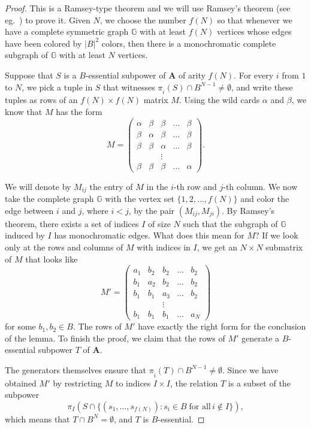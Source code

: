 \documentclass{amsart}
\theoremstyle{plain}
\theoremstyle{definition}
\begin{document}
\begin{proof}
  This is a Ramsey-type theorem and we will use Ramsey's theorem (see eg.~\cite[Theorem 3.3]{a-course-in-combinatorics}) to prove it.
  Given $N$, we choose the number $f(N)$ so that whenever we have a complete symmetric
  graph ${\mathbb{{G}}}$ with at least $f(N)$ vertices whose
  edges have been colored by $|B|^2$ colors, then there is a monochromatic
  complete subgraph of ${\mathbb{{G}}}$ with at least $N$ vertices. 
  
  Suppose that $S$ is a $B$-essential subpower of ${{\mathbf{A}}}$ of arity $f(N)$.
  For every $i$ from $1$ to $N$, we pick a tuple in $S$ that witnesses
  $\pi_{\widehat{i}}(S)\cap B^{N-1} \neq \emptyset$, and write these tuples as rows of an
  $f(N)\times f(N)$ matrix $M$. Using the wild cards $\alpha$ and $\beta$, we
  know that $M$ has the form
  \[M=
    \begin{pmatrix}
      \alpha & \beta & \beta &\dots &\beta\\
      \beta & \alpha & \beta &\dots &\beta\\
      \beta & \beta & \alpha &\dots &\beta\\
		   &&\vdots\\
      \beta &\beta&\beta&\dots&\alpha
  \end{pmatrix}.
  \]
  
  We will denote by $M_{ij}$ the entry of $M$ in the $i$-th row and
  $j$-th column.
  We now take the complete graph ${\mathbb{{G}}}$ with the vertex set
  $\{1,2,\dots,f(N)\}$ and color the edge between $i$ and $j$, where $i<j$, by the pair $(M_{ij},M_{ji})$.
  By Ramsey's theorem, there exists a set of indices $I$ of size 
  $N$ such that the subgraph of ${\mathbb{{G}}}$ induced by $I$ has monochromatic edges.
  What does this mean for $M$? If we look only at the rows and columns of $M$ with indices in
  $I$, we get an $N\times N$ submatrix of $M$ that looks like
   \[
    M'=\begin{pmatrix}
      a_1 & b_2 & b_2 &\dots &b_2\\
      b_1 & a_2 & b_2 &\dots &b_2\\
      b_1 & b_1 & a_3 &\dots &b_2\\
		   &&\vdots\\
      b_1 & b_1& b_1&\dots& a_N
  \end{pmatrix}
  \]
  for some $b_1,b_2\in B$.
  The rows of $M'$ have exactly the right form for the conclusion of the
  lemma. To finish the proof, we claim that the rows of $M'$ generate a $B$-essential subpower $T$ of ${{\mathbf{A}}}$. 
  
  The generators themselves ensure that
  $\pi_{\widehat{i}}(T)\cap B^{N-1}\neq \emptyset$. Since we have obtained $M'$
  by restricting $M$ to indices $I\times I$, the relation $T$ is a subset of the subpower
  \[
    \pi_{I}(S\cap \{(s_1,\dots,s_{f(N)}) \colon s_i\in B\; \text{for all}\, i\not \in
    I\}),
  \]
  which means that $T\cap B^N=\emptyset$, and $T$ is $B$-essential.
\end{proof}
\end{document}
